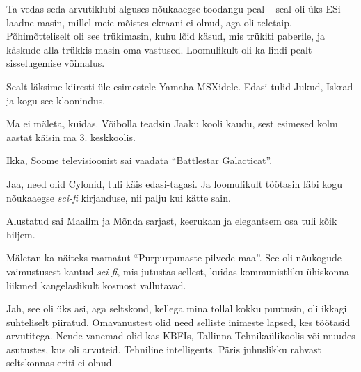 Ta vedas seda arvutiklubi alguses nõukaaegse toodangu peal -- seal oli üks
ESi-laadne masin, millel meie mõistes ekraani ei olnud, aga oli teletaip. 
Põhimõtteliselt oli see trükimasin, kuhu lõid käsud, mis trükiti 
paberile, ja käskude alla trükkis masin oma vastused. Loomulikult oli ka lindi pealt sisselugemise võimalus.

Sealt läksime kiiresti üle esimestele Yamaha 
MSXidele. Edasi tulid Jukud, 
Iskrad ja kogu see kloonindus.


Ma ei mäleta, kuidas. Võibolla teadsin Jaaku kooli kaudu, sest esimesed kolm aastat käisin ma 3. keskkoolis.


Ikka, Soome televisioonist sai vaadata \enquote{Battlestar Galacticat}.


Jaa, need olid Cylonid, tuli käis edasi-tagasi. Ja loomulikult töötasin läbi kogu nõukaaegse 
\emph{sci-fi} kirjanduse, nii palju kui kätte sain.


Alustatud sai Maailm ja Mõnda sarjast, keerukam ja elegantsem osa tuli kõik hiljem. 

Mäletan ka näiteks raamatut \enquote{Purpurpunaste pilvede 
maa}. See oli nõukogude vaimustusest 
kantud \emph{sci-fi}, mis jutustas sellest, kuidas kommunistliku ühiskonna liikmed 
kangelaslikult kosmost vallutavad.


Jah, see oli üks asi, aga seltskond, kellega mina tollal kokku puutusin, oli 
ikkagi suhteliselt piiratud. Omavanustest olid need selliste inimeste 
lapsed, kes töötasid arvutitega. Nende vanemad olid kas 
KBFIs, Tallinna Tehnikaülikoolis või muudes asutustes, kus oli arvuteid. 
Tehniline intelligents. Päris juhuslikku rahvast seltskonnas eriti ei 
olnud.

